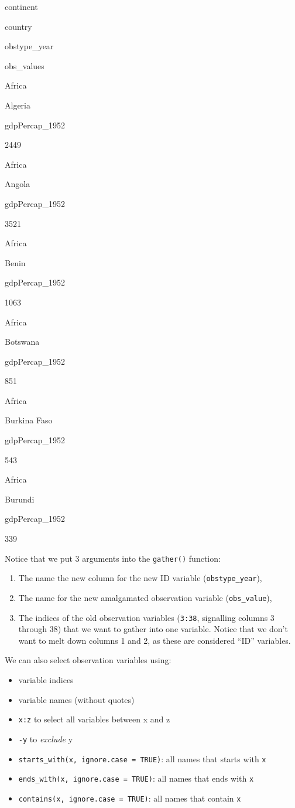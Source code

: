 \documentclass[]{book}
\providecommand{\tightlist}{%
  \setlength{\itemsep}{0pt}\setlength{\parskip}{0pt}}
\begin{document}
continent

country

obstype\_year

obs\_values

Africa

Algeria

gdpPercap\_1952

2449

Africa

Angola

gdpPercap\_1952

3521

Africa

Benin

gdpPercap\_1952

1063

Africa

Botswana

gdpPercap\_1952

851

Africa

Burkina Faso

gdpPercap\_1952

543

Africa

Burundi

gdpPercap\_1952

339

Notice that we put 3 arguments into the \texttt{gather()} function:

\begin{enumerate}
\def\labelenumi{\arabic{enumi}.}
\tightlist
\item
  The name the new column for the new ID variable
  (\texttt{obstype\_year}),
\item
  The name for the new amalgamated observation variable
  (\texttt{obs\_value}),
\item
  The indices of the old observation variables (\texttt{3:38},
  signalling columns 3 through 38) that we want to gather into one
  variable. Notice that we don't want to melt down columns 1 and 2, as
  these are considered ``ID'' variables.
\end{enumerate}

We can also select observation variables using:

\begin{itemize}
\tightlist
\item
  variable indices
\item
  variable names (without quotes)
\item
  \texttt{x:z} to select all variables between x and z
\item
  \texttt{-y} to \emph{exclude} y
\item
  \texttt{starts\_with(x,\ ignore.case\ =\ TRUE)}: all names that starts
  with \texttt{x}
\item
  \texttt{ends\_with(x,\ ignore.case\ =\ TRUE)}: all names that ends
  with \texttt{x}
\item
  \texttt{contains(x,\ ignore.case\ =\ TRUE)}: all names that contain
  \texttt{x}
\end{itemize}
\end{document}
